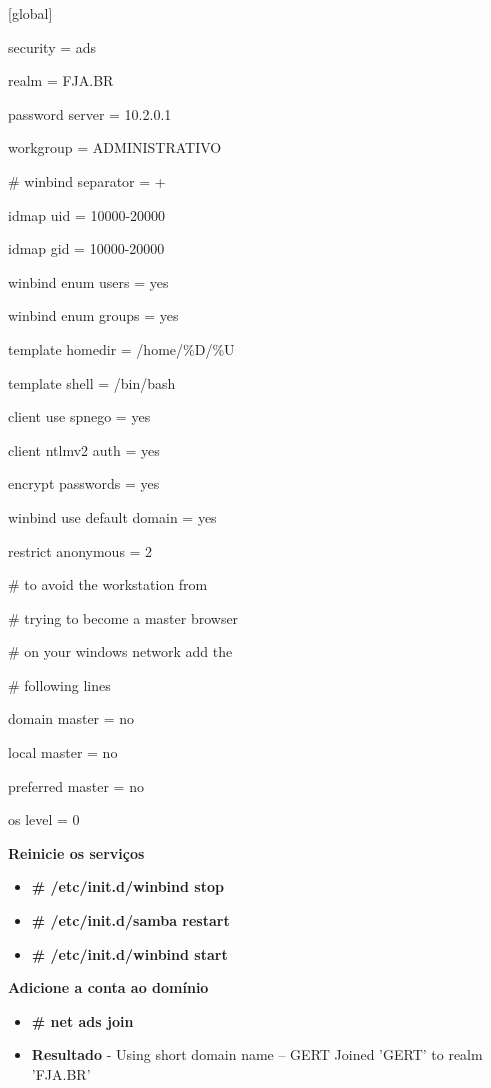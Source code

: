 [global]

        security = ads

        realm = FJA.BR

        password server = 10.2.0.1

        workgroup = ADMINISTRATIVO

\#       winbind separator = +

        idmap uid = 10000-20000

        idmap gid = 10000-20000

        winbind enum users = yes

        winbind enum groups = yes

        template homedir = /home/\%D/\%U

        template shell = /bin/bash

        client use spnego = yes

        client ntlmv2 auth = yes

        encrypt passwords = yes

        winbind use default domain = yes

        restrict anonymous = 2

\# to avoid the workstation from

\# trying to become a master browser

\# on your windows network add the

\# following lines

        domain master = no

        local master = no

        preferred master = no

        os level = 0

\textbf{Reinicie os serviços}

\begin{itemize}
	\item \textbf{\# /etc/init.d/winbind stop}
	\item \textbf{\# /etc/init.d/samba restart}
	\item \textbf{\# /etc/init.d/winbind start}
\end{itemize}

\textbf{Adicione a conta ao domínio}

\begin{itemize}
	\item \textbf{\# net ads join}
	\item \textbf{Resultado} - Using short domain name – GERT Joined 'GERT' to realm 'FJA.BR'
\end{itemize}


